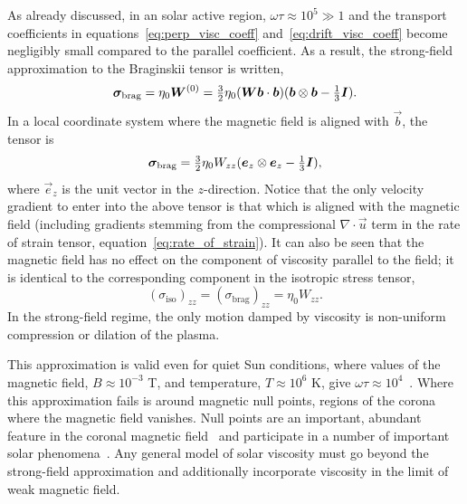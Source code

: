 As already discussed, in an solar active region, $\omega \tau \approx 10^5 \gg 1$ and the transport coefficients in equations~\ref{eq:perp_visc_coeff} and~\ref{eq:drift_visc_coeff} become negligibly small compared to the parallel coefficient. As a result, the strong-field approximation to the Braginskii tensor is written,
\begin{equation}
  \label{eq:strong_field_approx}
{\bm \sigma}_{\text{brag}} = \eta_0 {\bm W}^{(0)} = \tfrac{3}{2} \eta_0 ({\bm W} {\bm b} \cdot {\bm b}) ( {\bm b} \otimes {\bm b} - \tfrac{1}{3} {\bm I}).
\end{equation}
In a local coordinate system where the magnetic field is aligned with $\vec{b}$, the tensor is
\begin{equation}
  \label{eq:z_aligned_strong_field_approx}
{\bm \sigma}_{\text{brag}} = \tfrac{3}{2} \eta_0 W_{zz} ( {\bm e}_z \otimes {\bm e}_z - \tfrac{1}{3} {\bm I}),
\end{equation}
where $\vec{e}_z$ is the unit vector in the $z$-direction. Notice that the only velocity gradient to enter into the above tensor is that which is aligned with the magnetic field (including gradients stemming from the compressional $\nabla \cdot \vec{u}$ term in the rate of strain tensor, equation~\ref{eq:rate_of_strain}). It can also be seen that the magnetic field has no effect on the component of viscosity parallel to the field; it is identical to the corresponding component in the isotropic stress tensor,
\begin{equation}
  \label{eq:z_aligned_iso}
  (\sigma_{\text{iso}})_{zz} = (\sigma_{\text{brag}})_{zz} = \eta_0 W_{zz}.
\end{equation}
In the strong-field regime, the only motion damped by viscosity is non-uniform compression or dilation of the plasma. 

This approximation is valid even for quiet Sun conditions, where values of the magnetic field, $B\approx 10^{-3}$ T, and temperature, $T\approx 10^6$ K, give $\omega\tau \approx 10^4$~\cite{morganGlobalConditionsSolar2017}. Where this approximation fails is around magnetic null points, regions of the corona where the magnetic field vanishes. Null points are an important, abundant feature in the coronal magnetic field~\cite{edwardsNullPointDistribution2015} and participate in a number of important solar phenomena~\cite{massonNATUREFLARERIBBONS2009,moreno-insertisPLASMAJETSERUPTIONS2013,barnesRelationshipCoronalMagnetic2007}. Any general model of solar viscosity must go beyond the strong-field approximation and additionally incorporate viscosity in the limit of weak magnetic field.

